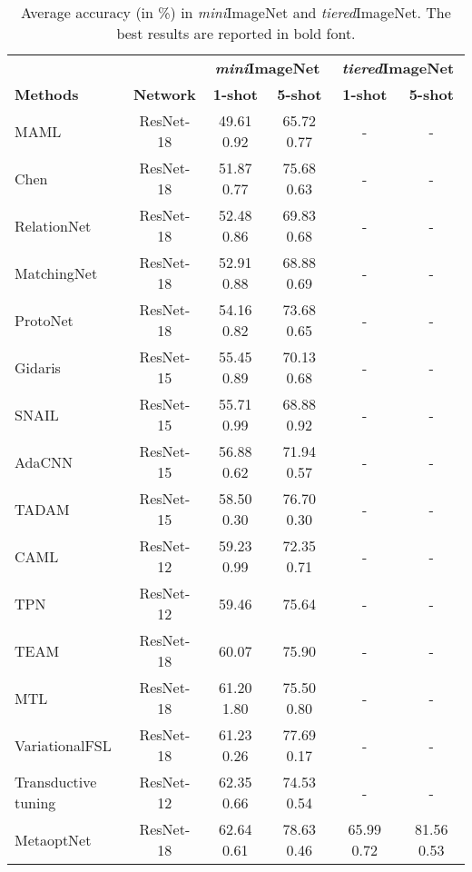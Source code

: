 \documentclass{article}
\begin{document}
\begin{table*}[t]
\caption{Average accuracy (in \%) in \textit{mini}ImageNet and \textit{tiered}ImageNet. The best results are reported in bold font.}
\label{tab:miniimagenet}
\vskip 0.1in
\begin{center}
\begin{small}
\begin{tabular}{lc|cc|cc}
\toprule
& &\multicolumn{2}{c|}{\textbf{\textit{mini}ImageNet}}&\multicolumn{2}{c}{\textbf{\textit{tiered}ImageNet}} \\
\cline{3-6}
\textbf{Methods} & \textbf{Network}&\textbf{1-shot}& \textbf{5-shot}& \textbf{1-shot}& \textbf{5-shot}\\
\hline
MAML \cite{Finn2017ModelAgnosticMF} & ResNet-18 & 49.61  0.92 & 65.72  0.77&-&-\\
Chen \cite{chen2018a} & ResNet-18 & 51.87  0.77 & 75.68  0.63&-&-\\
RelationNet \cite{sung2018learning} & ResNet-18 & 52.48  0.86 & 69.83  0.68&-&-\\
MatchingNet \cite{Vinyals2016MatchingNF} & ResNet-18 & 52.91  0.88 & 68.88  0.69&-&-\\
ProtoNet \cite{snell2017prototypical} & ResNet-18 & 54.16  0.82 & 73.68  0.65&-&-\\
Gidaris \cite{gidaris2018dynamic}  & ResNet-15 & 55.45  0.89 & 70.13  0.68&-&-\\
SNAIL \cite{mishra2018a} & ResNet-15 & 55.71  0.99 & 68.88  0.92&-&-\\
AdaCNN \cite{pmlr-v80-munkhdalai18a} & ResNet-15 & 56.88  0.62 & 71.94  0.57&-&-\\
TADAM \cite{oreshkin2018tadam}  & ResNet-15 & 58.50  0.30 & 76.70  0.30&-&-\\
CAML \cite{jiang2018learning} & ResNet-12 & 59.23  0.99 & 72.35  0.71&-&-\\
TPN \cite{liu2018learning} & ResNet-12 & 59.46 & 75.64&-&-\\
TEAM \cite{team}& ResNet-18 & 60.07 & 75.90&-&-\\
MTL \cite{sun2019mtl}  & ResNet-18 & 61.20  1.80 & 75.50  0.80&-&-\\
VariationalFSL \cite{Variationalfewshot}  & ResNet-18 & 61.23  0.26 & 77.69  0.17&-&-\\
Transductive tuning \cite{Dhillon2020A} & ResNet-12 & 62.35  0.66 & 74.53  0.54&-&-\\
MetaoptNet \cite{lee2019meta}  & ResNet-18 & 62.64  0.61 & 78.63  0.46&65.99  0.72 & 81.56  0.53\\

\end{tabular}
\end{small}
\end{center}
\end{table*}
\end{document}
